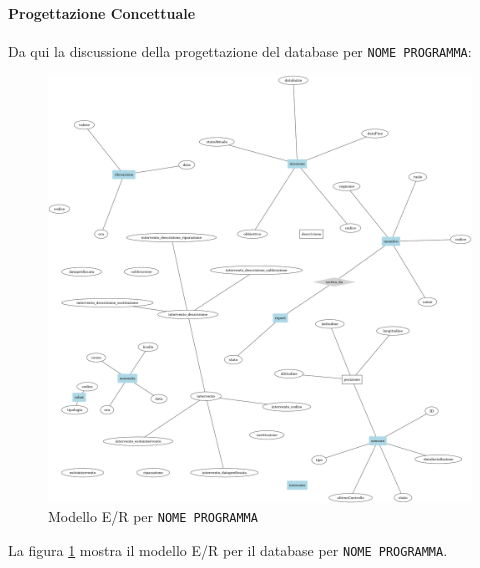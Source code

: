 \paragraph{Progettazione Concettuale}
Da qui la discussione della progettazione del database
per \texttt{NOME PROGRAMMA}:
\begin{figure}
  \includegraphics[width=\linewidth]{images/er.png}
  \caption{Modello E/R per \texttt{NOME PROGRAMMA}}
  \label{fig:boat1}
\end{figure}

La figura \ref{fig:boat1} mostra il modello E/R per il
database per \texttt{NOME PROGRAMMA}.
